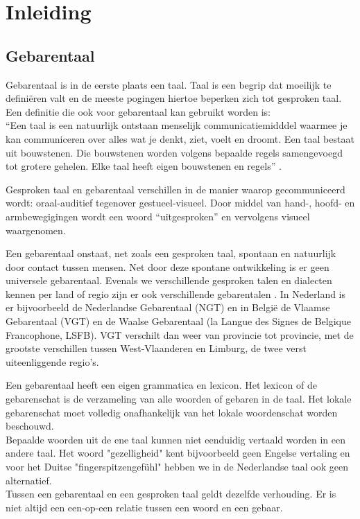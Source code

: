 \chapter{Inleiding}
\section{Gebarentaal}

Gebarentaal is in de eerste plaats een taal. Taal is een begrip dat moeilijk te defini\"eren valt en de meeste pogingen hiertoe beperken zich tot gesproken taal. Een definitie die ook voor gebarentaal kan gebruikt worden is: 
\\``Een taal is een natuurlijk ontstaan menselijk communicatiemidddel waarmee je kan communiceren over alles wat je denkt, ziet, voelt en droomt. Een taal bestaat uit bouwstenen. Die bouwstenen worden volgens bepaalde regels samengevoegd tot grotere gehelen. Elke taal heeft eigen bouwstenen en regels'' \cite{buyens_gebarentaaltolken_2003}.

\npar Gesproken taal en gebarentaal verschillen in de manier waarop gecommuniceerd wordt: oraal-auditief tegenover gestueel-visueel. Door middel van hand-, hoofd- en armbewegigingen wordt een woord ``uitgesproken'' en vervolgens visueel waargenomen.

\npar Een gebarentaal onstaat, net zoals een gesproken taal, spontaan en natuurlijk door contact tussen mensen. Net door deze spontane ontwikkeling is er geen universele gebarentaal. Evenals we verschillende gesproken talen en dialecten kennen per land of regio zijn er ook verschillende gebarentalen \cite{VGT-standard}. In Nederland is er bijvoorbeeld de Nederlandse Gebarentaal (NGT) en in Belgi\"e de Vlaamse Gebarentaal (VGT) en de Waalse Gebarentaal (la Langue des Signes de Belgique Francophone, LSFB). VGT verschilt dan weer van provincie tot provincie, met de grootste verschillen tussen West-Vlaanderen en Limburg, de twee verst uiteenliggende regio's.

\npar Een gebarentaal heeft een eigen grammatica en lexicon. Het lexicon of de gebarenschat is de verzameling van alle woorden of gebaren in de taal. Het lokale gebarenschat moet volledig onafhankelijk van het lokale woordenschat worden beschouwd.
\\Bepaalde woorden uit de ene taal kunnen niet eenduidig vertaald worden in een andere taal. Het woord "gezelligheid" kent bijvoorbeeld geen Engelse vertaling en voor het Duitse "fingerspitzengef\"uhl" hebben we in de Nederlandse taal ook geen alternatief.
\\Tussen een gebarentaal en een gesproken taal geldt dezelfde verhouding. Er is niet altijd een een-op-een relatie tussen een woord en een gebaar.

